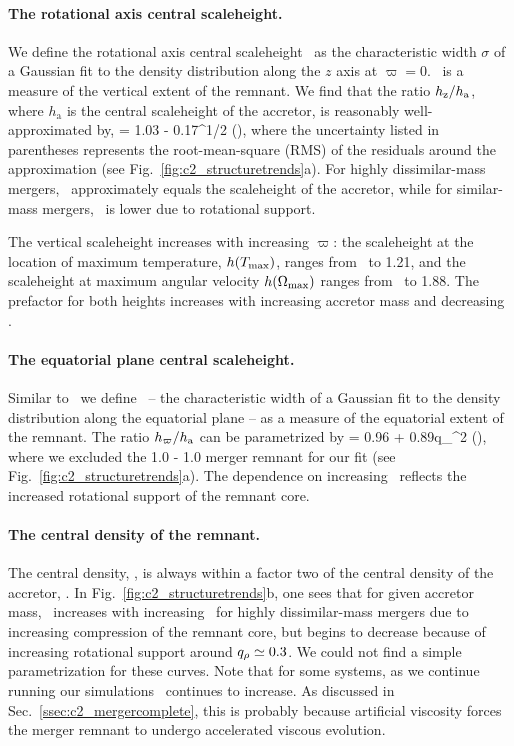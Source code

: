 \paragraph{The rotational axis central scaleheight.} We define the rotational axis central scaleheight \hz\ as the characteristic width $\sigma$ of a Gaussian fit to the density distribution along the $z$ axis at $\varpi = 0$.  \hz\ is a measure of the vertical extent of the remnant.  We find that the ratio $\hz/h_{\rm a}$, where $h_\mathrm{a}$ is the central scaleheight of the accretor, is reasonably well-approximated by,
\eqbegin
{} = 1.03 - 0.17\qrho^{1/2}
\qquad(),
\eqend
where the uncertainty listed in parentheses represents the root-mean-square (RMS) of the residuals around the approximation (see Fig.~\ref{fig:c2_structuretrends}a).  For highly dissimilar-mass mergers, \hz\ approximately equals the scaleheight of the accretor, while for similar-mass mergers, \hz\ is lower due to rotational support.

The vertical scaleheight increases with increasing $\varpi$: the scaleheight at the location of maximum temperature, $h(T_{\rm max})$, ranges from \hz\ to 1.21\hz, and the scaleheight at maximum angular velocity $h(\Omega_{\rm max})$ ranges from \hz\ to 1.88\hz.  The prefactor for both heights increases with increasing accretor mass {\Ma} and decreasing \qrho. 

\paragraph{The equatorial plane central scaleheight.}  Similar to \hz\, we define \hxy\ -- the characteristic width of a Gaussian fit to the density distribution along the equatorial plane -- as a measure of the equatorial extent of the remnant.  The ratio $\hxy/h_{\rm a}$ can be parametrized by
\eqbegin
{} = 0.96 + 0.89q_\rho^2
\qquad(),
\eqend
where we excluded the 1.0 - 1.0 {\Msun} merger remnant for our fit (see Fig.~\ref{fig:c2_structuretrends}a).  The dependence on increasing \qrho\ reflects the increased rotational support of the remnant core.

\paragraph{The central density of the remnant.}  The central density, \rhoc, is always within a factor two of the central density of the accretor, \rhoca.  In Fig.~\ref{fig:c2_structuretrends}b, one sees that for given accretor mass, \rhocrhoct\ increases with increasing \qrho\ for highly dissimilar-mass mergers due to increasing compression of the remnant core, but begins to decrease because of increasing rotational support around $\qrho\simeq0.3$.  We could not find a simple parametrization for these curves.  Note that for some systems, as we continue running our simulations \rhocrhoct\ continues to increase.  As discussed in Sec.~\ref{ssec:c2_mergercomplete}, this is probably because artificial viscosity forces the merger remnant to undergo accelerated viscous evolution.

